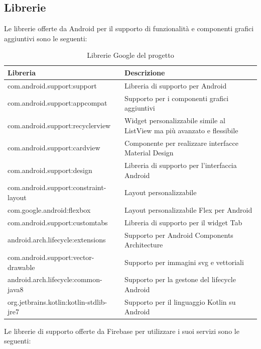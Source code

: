 \subsection{Librerie}
Le librerie offerte da Android per il supporto di funzionalità e componenti grafici aggiuntivi sono le seguenti:
\begin{table}[!h]
\begin{center}
\begin{tabular}{|l|p{6cm}|}
    \hline
\textbf{Libreria} & \textbf{Descrizione}\\ \hline
com.android.support:support & Libreria di supporto per Android  \\ \hline
com.android.support:appcompat & Supporto per i componenti grafici aggiuntivi \\ \hline
com.android.support:recyclerview & Widget personalizzabile simile al ListView ma più avanzato e flessibile \\ \hline
com.android.support:cardview & Componente per realizzare interfacce Material Design \\ \hline
com.android.support:design & Libreria di supporto per l'interfaccia Android  \\ \hline
com.android.support:constraint-layout & Layout personalizzabile \\ \hline
com.google.android:flexbox  & Layout personalizzabile Flex per Android  \\ \hline
com.android.support:customtabs & Libreria di supporto per il widget Tab  \\ \hline
android.arch.lifecycle:extensions & Supporto per Android Components Architecture \\ \hline
com.android.support:vector-drawable & Supporto per immagini svg e vettoriali  \\ \hline
android.arch.lifecycle:common-java8 &  Supporto per la gestone del lifecycle Android \\ \hline
org.jetbrains.kotlin:kotlin-stdlib-jre7 & Supporto per il linguaggio Kotlin su Android \\ \hline
\end{tabular}
\caption[Librerie Google del progetto]{Librerie Google del progetto}\label{tab:Librerie Google del progetto}
\end{center}
\end{table}

\newpage

Le librerie di supporto offerte da Firebase per utilizzare i suoi servizi sono le seguenti:

